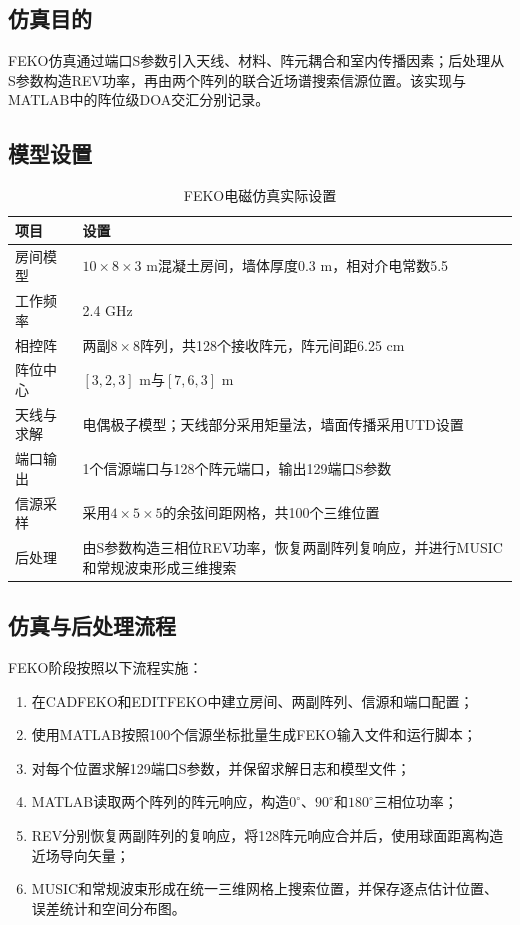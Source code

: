 \documentclass[UTF8,a4paper,12pt]{ctexart}
\begin{document}
\subsection{仿真目的}

FEKO仿真通过端口S参数引入天线、材料、阵元耦合和室内传播因素；后处理从S参数构造REV功率，再由两个阵列的联合近场谱搜索信源位置。该实现与MATLAB中的阵位级DOA交汇分别记录。

\subsection{模型设置}

\begingroup
\small
\begin{table}[htbp]
\centering
\caption{FEKO电磁仿真实际设置}
\begin{tabularx}{\textwidth}{p{3.2cm}Y}
\toprule
项目 & 设置\\
\midrule
房间模型 & $10\times8\times3$ m混凝土房间，墙体厚度0.3 m，相对介电常数5.5\\
工作频率 & 2.4 GHz\\
相控阵 & 两副$8\times8$阵列，共128个接收阵元，阵元间距6.25 cm\\
阵位中心 & $[3,2,3]$ m与$[7,6,3]$ m\\
天线与求解 & 电偶极子模型；天线部分采用矩量法，墙面传播采用UTD设置\\
端口输出 & 1个信源端口与128个阵元端口，输出129端口S参数\\
信源采样 & 采用$4\times5\times5$的余弦间距网格，共100个三维位置\\
后处理 & 由S参数构造三相位REV功率，恢复两副阵列复响应，并进行MUSIC和常规波束形成三维搜索\\
\bottomrule
\end{tabularx}
\end{table}

\subsection{仿真与后处理流程}

FEKO阶段按照以下流程实施：

\begin{enumerate}
  \item 在CADFEKO和EDITFEKO中建立房间、两副阵列、信源和端口配置；
  \item 使用MATLAB按照100个信源坐标批量生成FEKO输入文件和运行脚本；
  \item 对每个位置求解129端口S参数，并保留求解日志和模型文件；
  \item MATLAB读取两个阵列的阵元响应，构造$0^\circ$、$90^\circ$和$180^\circ$三相位功率；
  \item REV分别恢复两副阵列的复响应，将128阵元响应合并后，使用球面距离构造近场导向矢量；
  \item MUSIC和常规波束形成在统一三维网格上搜索位置，并保存逐点估计位置、误差统计和空间分布图。
\end{enumerate}
\endgroup
\end{document}

